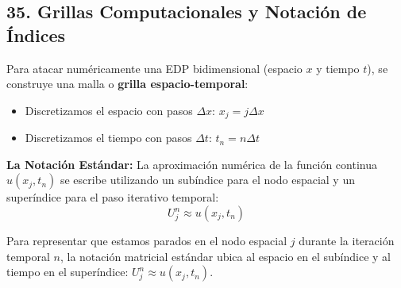 \documentclass[12pt]{article}
\begin{document}
\subsection*{35. Grillas Computacionales y Notación de Índices}
Para atacar numéricamente una EDP bidimensional (espacio $x$ y tiempo $t$), se construye una malla o \textbf{grilla espacio-temporal}:
\begin{itemize}
    \item Discretizamos el espacio con pasos $\Delta x$: \quad $x_j = j \Delta x$
    \item Discretizamos el tiempo con pasos $\Delta t$: \quad $t_n = n \Delta t$
\end{itemize}
\textbf{La Notación Estándar:} La aproximación numérica de la función continua $u(x_j, t_n)$ se escribe utilizando un subíndice para el nodo espacial y un superíndice para el paso iterativo temporal:
\begin{equation}
    U_j^n \approx u(x_j, t_n)
\end{equation}

Para representar que estamos parados en el nodo espacial $j$ durante la iteración temporal $n$, la notación matricial estándar ubica al espacio en el subíndice y al tiempo en el superíndice: $U_j^n \approx u(x_j, t_n)$.
\end{document}

